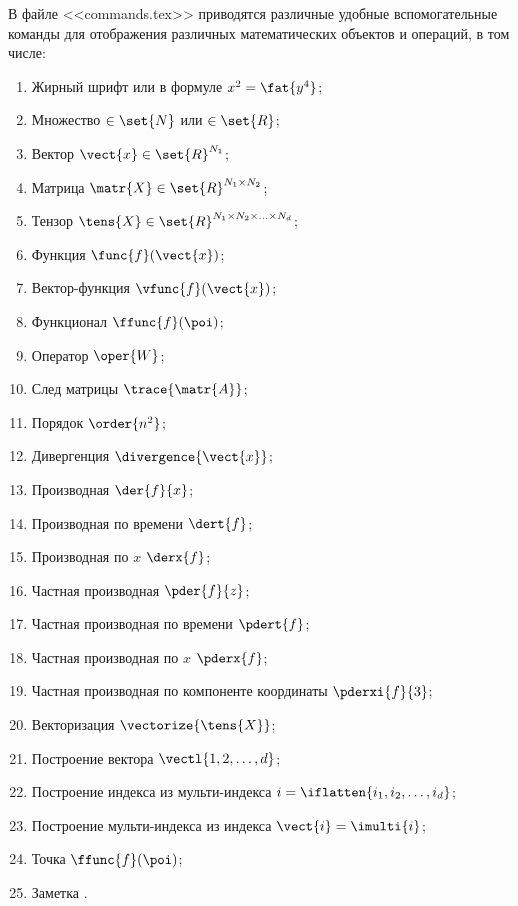   В файле <<commands.tex>> приводятся различные удобные вспомогательные команды для отображения различных математических объектов и операций, в том числе:
  \begin{enumerate}
    \item Жирный шрифт
       или в формуле $x^2 = \fat{y^4}$;
    \item Множество
      $\in \set{N}$ или $\in \set{R}$;
    \item Вектор
      $\vect{x} \in \set{R}^{N_1}$;
    \item Матрица
      $\matr{X} \in \set{R}^{N_1 \times N_2}$;
    \item Тензор
      $\tens{X} \in \set{R}^{N_1 \times N_2 \times \ldots \times N_d}$;
    \item Функция
      $\func{f}(\vect{x})$;
    \item Вектор-функция
      $\vfunc{f}(\vect{x})$;
    \item Функционал
      $\ffunc{f}(\poi)$;
    \item Оператор
      $\oper{W}$;
    \item След матрицы
      $\trace{\matr{A}}$;
    \item Порядок
      $\order{n^2}$;
    \item Дивергенция
      $\divergence{\vect{x}}$;
    \item Производная
      $\der{f}{x}$;
    \item Производная по времени
      $\dert{f}$;
    \item Производная по $x$
      $\derx{f}$;
    \item Частная производная
      $\pder{f}{z}$;
    \item Частная производная по времени
      $\pdert{f}$;
    \item Частная производная по $x$
      $\pderx{f}$;
    \item Частная производная по компоненте координаты
      $\pderxi{f}{3}$;
    \item Векторизация
      $\vectorize{\tens{X}}$;
    \item Построение вектора
      $\vectl{1, 2, \ldots, d}$;
    \item Построение индекса из мульти-индекса
      $i = \iflatten{i_1, i_2, \ldots, i_d}$;
    \item Построение мульти-индекса из индекса
      $\vect{i} = \imulti{i}$;
    \item Точка
      $\ffunc{f}(\poi)$;
    \item Заметка .
  \end{enumerate}

